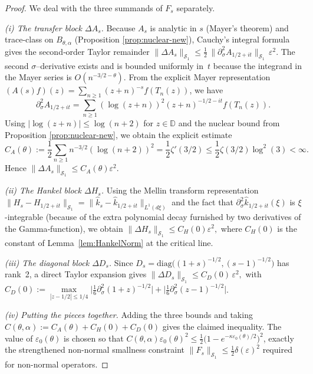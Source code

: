 \documentclass[11pt,a4paper]{article}
\theoremstyle{definition}
\theoremstyle{remark}
\begin{document}
\begin{proof}
We deal with the three summands of \(F_s\) separately.

\smallskip
\noindent\emph{(i)  The transfer block \(\Delta A_s\).}
Because \(A_s\) is analytic in \(s\) (Mayer's theorem) and
trace‑class on \(B_{\theta,\alpha}\) (Proposition \ref{prop:nuclear-new}),
Cauchy's integral formula gives the second‑order Taylor remainder
\(
   \|\Delta A_s\|_{\mathcal S_1}
   \le \tfrac12\,\bigl\|\partial_{\sigma}^{2}A_{1/2+it}\bigr\|_{\mathcal S_1}
         \,\varepsilon^{2}.
\)
The second $\sigma$–derivative exists and is bounded uniformly in~\(t\)
because the integrand in the Mayer series is \(O(n^{-3/2-\theta})\).
From the explicit Mayer representation $(A(s)f)(z) = \sum_{n\geq 1}(z+n)^{-s}f(T_n(z))$,
we have
\[
\partial_{\sigma}^2 A_{1/2+it} = \sum_{n\geq 1} (\log(z+n))^2 (z+n)^{-1/2-it} f(T_n(z)).
\]
Using $|\log(z+n)| \leq \log(n+2)$ for $z \in \mathbb{D}$ and the nuclear bound from Proposition \ref{prop:nuclear-new}, we obtain the explicit estimate
\[
C_A(\theta) := \frac{1}{2}\sum_{n\geq 1} n^{-3/2} (\log(n+2))^2 = \frac{1}{2}\zeta'(3/2) \leq \frac{1}{2}\zeta(3/2)\log^2(3) < \infty.
\]
Hence \(\|\Delta A_s\|_{\mathcal S_1}\le C_{A}(\theta)\varepsilon^{2}\).

\smallskip
\noindent\emph{(ii)  The Hankel block \(\Delta H_s\).}
Using the Mellin transform representation
\(
    \|H_s-H_{1/2+it}\|_{\mathcal S_1}
    =
    \bigl\|\hat k_s-\hat k_{1/2+it}\bigr\|_{L^{1}(d\xi)}
\)
and the fact that \(\partial_{\sigma}^{2}\hat k_{1/2+it}(\xi)\) is
\(\xi\)-integrable (because of the extra polynomial decay furnished by
two derivatives of the Gamma‑function), we obtain
\(
    \|\Delta H_s\|_{\mathcal S_1}
    \le C_{H}(0)\varepsilon^{2},
\)
where \(C_H(0)\) is the constant of Lemma~\ref{lem:HankelNorm} at the
critical line.

\smallskip
\noindent\emph{(iii)  The diagonal block \(\Delta D_s\).}
Since \(D_s=\mathrm{diag}\bigl((1+s)^{-1/2},(s-1)^{-1/2}\bigr)\) has rank~2,
a direct Taylor expansion gives
\(
    \|\Delta D_s\|_{\mathcal S_1}
    \le C_D(0)\,\varepsilon^{2},
\)
with \(C_D(0):=\max\limits_{|z-1/2|\le1/4}
               \bigl|\tfrac16\partial_{\sigma}^{2}(1+z)^{-1/2}\bigr|
               +\bigl|\tfrac16\partial_{\sigma}^{2}(z-1)^{-1/2}\bigr|\).

\smallskip
\noindent\emph{(iv)  Putting the pieces together.}
Adding the three bounds and taking
\(C(\theta,\alpha):=C_A(\theta)+C_H(0)+C_D(0)\)
gives the claimed inequality.
The value of \(\varepsilon_{0}(\theta)\) is chosen so that
\(C(\theta,\alpha)\varepsilon_{0}(\theta)^{2}\le 
\tfrac12\bigl(1-e^{-\kappa\varepsilon_{0}(\theta)/2}\bigr)^2\),
exactly the strengthened non-normal smallness constraint 
$\|F_s\|_{\mathcal{S}_1} \leq \frac{1}{2}\delta(\varepsilon)^2$ required for non-normal operators.
\end{proof}
\end{document}
